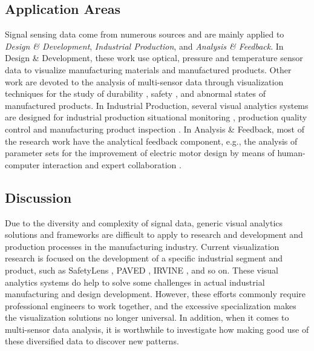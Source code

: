 \documentclass[a4paper,fleqn]{cas-dc}
\begin{document}
\subsection{Application Areas}
Signal sensing data come from numerous sources and are mainly applied to \textit{Design \& Development}, \textit{Industrial Production}, and \textit{Analysis \& Feedback}.
In Design \& Development, these work \cite{Huettenberger2015, Suzuki2020, Zappulla2019} use optical, pressure and temperature sensor data to visualize manufacturing materials and manufactured products. Other work are devoted to the analysis of multi-sensor data through visualization techniques for the study of durability \cite{zhao2019visual}, safety \cite{narechania2020safetylens}, and abnormal states \cite{eirich2021irvine} of manufactured products.
In Industrial Production, several visual analytics systems are designed for industrial production situational monitoring \cite{Zhou2018}, production quality control \cite{Huettenberger2015} and manufacturing product inspection \cite{eirich2021irvine}.
In Analysis \& Feedback, most of the research work have the analytical feedback component, e.g., the analysis of parameter sets for the improvement of electric motor design by means of human-computer interaction and expert collaboration \cite{cibulski2020paved}.


\subsection{Discussion}
Due to the diversity and complexity of signal data, generic visual analytics solutions and frameworks are difficult to apply to research and development and production processes in the manufacturing industry.
Current visualization research is focused on the development of a specific industrial segment and product, such as SafetyLens \cite{narechania2020safetylens}, PAVED \cite{cibulski2020paved}, IRVINE \cite{eirich2021irvine}, and so on. These visual analytics systems do help to solve some challenges in actual industrial manufacturing and design development. However, these efforts commonly require professional engineers to work together, and the excessive specialization makes the visualization solutions no longer universal. In addition, when it comes to multi-sensor data analysis, it is worthwhile to investigate how making good use of these diversified data to discover new patterns. 
\end{document}
